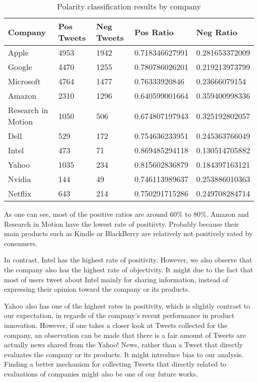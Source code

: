 \documentclass[12pt]{article}
\begin{document}
\begin{table}
\begin{center}
    \begin{tabular}{ | l || l | l | l | l | }
        \hline
        \textbf{Company} &  \textbf{Pos Tweets} & \textbf{Neg Tweets} & \textbf{Pos Ratio} & \textbf{Neg Ratio} \\ \hline
        \hline
        Apple &  4953 & 1942 & 0.718346627991 & 0.281653372009 \\ \hline
        Google &  4470 & 1255 & 0.780786026201 & 0.219213973799 \\ \hline
        Microsoft &  4764 & 1477 & 0.76333920846 & 0.23666079154 \\ \hline
        Amazon &  2310 & 1296 & 0.640599001664 & 0.359400998336 \\ \hline
        Research in Motion &  1050 & 506 & 0.674807197943 & 0.325192802057 \\ \hline
        Dell &  529 & 172 & 0.754636233951 & 0.245363766049 \\ \hline
        Intel &  473 & 71 & 0.869485294118 & 0.130514705882 \\ \hline
        Yahoo &  1035 & 234 & 0.815602836879 & 0.184397163121 \\ \hline
        Nvidia &  144 & 49 & 0.746113989637 & 0.253886010363 \\ \hline
        Netflix &  643 & 214 & 0.750291715286 & 0.249708284714 \\ \hline
    \end{tabular}
\caption{Polarity classification results by company}
\label{polarity-by-company}
\end{center}
\end{table}

As one can see, most of the positive ratios are around $60\%$ to $80\%$. Amazon and Research in Motion have the lowest rate of positiivty. Probably because their main products such as Kindle or BlackBerry are relatively not positively rated by consumers. 

In contrast, Intel has the highest rate of positivity. However, we also observe that the company also has the highest rate of objectivity. It might due to the fact that most of users tweet about Intel mainly for sharing information, instead of expressing their opinion toward the company or its products.

Yahoo also has one of the highest rates in positivity, which is slightly contrast to our expectation, in regards of the company's recent performance in product innovation. However, if one takes a closer look at Tweets collected for the company, an observation can be made that there is a fair amount of Tweets are actually news shared from the Yahoo! News, rather than a Tweet that directly evaluates the company or its products. It might introduce bias to our analysis. Finding a better mechanism for collecting Tweets that directly related to evaluations of companies might also be one of our future works.
\end{document}
